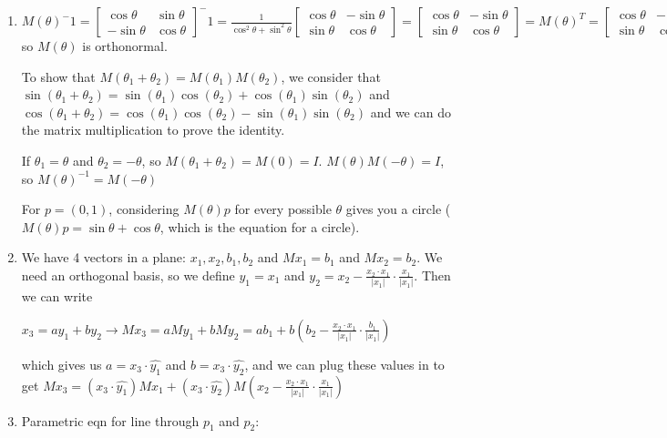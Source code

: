 \documentclass{article}
\begin{document}
\begin{enumerate}
	\item $M(\theta)^-1 = \begin{bmatrix} \cos\theta & \sin\theta \\ -\sin\theta & \cos\theta \end{bmatrix}^-1 = \frac{1}{\cos^2\theta + \sin^2\theta} \begin{bmatrix} \cos\theta & -\sin\theta \\ \sin\theta & \cos\theta \end{bmatrix} = \begin{bmatrix} \cos\theta & -\sin\theta \\ \sin\theta & \cos\theta \end{bmatrix} =  M(\theta)^T = \begin{bmatrix} \cos\theta & -\sin\theta \\ \sin\theta & \cos\theta \end{bmatrix} $ so $M(\theta)$ is orthonormal.
	
	To show that $M(\theta_1+\theta_2)=M(\theta_1)M(\theta_2)$, we consider that $\sin(\theta_1+\theta_2)=\sin(\theta_1)\cos(\theta_2)+\cos(\theta_1)\sin(\theta_2)$ and $\cos(\theta_1+\theta_2)=\cos(\theta_1)\cos(\theta_2)-\sin(\theta_1)\sin(\theta_2)$ and we can do the matrix multiplication to prove the identity. 
	
	If $\theta_1=\theta$ and $\theta_2=-\theta$, so $M(\theta_1+\theta_2)=M(0)=I$. $M(\theta)M(-\theta)=I$, so $M(\theta)^{-1}=M(-\theta)$
	
	For $p=(0,1)$, considering $M(\theta)p$ for every possible $\theta$ gives you a circle ($M(\theta)p=\sin\theta+\cos\theta$, which is the equation for a circle).
	
	\item We have 4 vectors in a plane: $x_1,x_2,b_1,b_2$ and $Mx_1=b_1$ and $Mx_2=b_2$. We need an orthogonal basis, so we define $y_1=x_1$ and $y_2=x_2-\frac{x_2\cdot x_1}{|x_1|}\cdot \frac{x_1}{|x_1|} $. Then we can write \begin{center}
	$x_3=ay_1+by_2 \rightarrow Mx_3 = aMy_1+bMy_2=ab_1+b(b_2-\frac{x_2\cdot x_1}{|x_1|}\cdot	\frac{b_1}{|x_1|}  )$ 
\end{center}
which gives us $a=x_3\cdot \hat{y_1}$ and $b=x_3\cdot\hat{y_2}$, and we can plug these values in to get $Mx_3=(x_3\cdot\hat{y_1})Mx_1+(x_3\cdot\hat{y_2})M(x_2-\frac{x_2\cdot x_1}{|x_1|}\cdot \frac{x_1}{|x_1|})$

\item Parametric eqn for line through {\bf $p_1$}  and {\bf $p_2$}: 


\end{enumerate}
\end{document}
